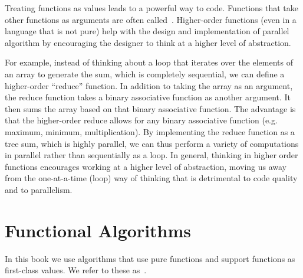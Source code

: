 \begin{cluster}
\label{grp:grm:language::functional-algorithms::treating}

\begin{gram}
\label{grm:language::functional-algorithms::treating}
Treating functions as values leads to a powerful way to code.  
Functions that take other functions as arguments are often
called~.
Higher-order functions (even in a language that is not pure)
help with the design and implementation of parallel algorithm by
encouraging the designer to think at a higher level of abstraction.

For example, instead of thinking about a loop that iterates over the
elements of an array to generate the sum, which is completely
sequential, we can define a higher-order ``reduce'' function. 
In addition to taking the array as an argument, the reduce function
takes a binary associative function as another argument.  It then sums
the array based on that binary associative function.
The advantage is that the higher-order reduce allows for any
binary associative function (e.g. maximum, minimum, multiplication).
By implementing the reduce function as a tree sum, which is highly
parallel, we can thus perform a variety of computations in parallel
rather than sequentially as a loop.
In general, thinking in higher order functions encourages working at a
higher level of abstraction, moving us away from the one-at-a-time
(loop) way of thinking that is detrimental to code quality and
to parallelism.

\end{gram}
\end{cluster}


\section{Functional Algorithms}
\label{sec:language::functional-algorithms::functional-algorithms}

\begin{cluster}
\label{grp:grm:language::functional-algorithms::book}

\begin{gram}
\label{grm:language::functional-algorithms::book}
In this book we use algorithms that use pure functions and support functions as
first-class values.
We refer to these as~.

\end{gram}
\end{cluster}

